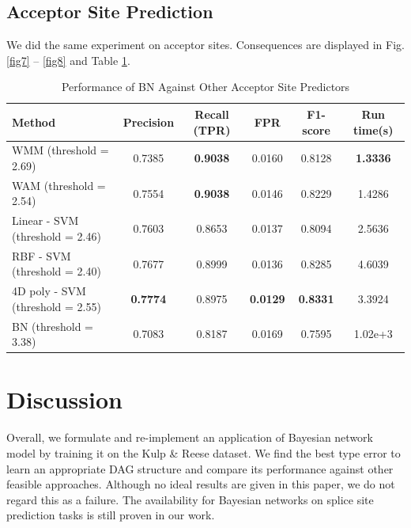 \documentclass[journal,twoside]{IEEEtran}
\begin{document}
\subsection{Acceptor Site Prediction}\label{4.3}

We did the same experiment on acceptor sites. Consequences are displayed in Fig. \ref{fig7} -- \ref{fig8} and Table \ref{tab3}. 


\begin{table}[htbp]
\begin{center}
\begin{threeparttable}
\caption{Performance of BN Against Other Acceptor Site Predictors}
\begin{tabular}{lccccc}
\toprule
Method & Precision & Recall (TPR) & FPR & F1-score & Run time(s) \\
\midrule
WMM (threshold = 2.69) & 0.7385 & \textbf{0.9038} & 0.0160 & 0.8128 & \textbf{1.3336} \\
WAM (threshold = 2.54) & 0.7554 & \textbf{0.9038} & 0.0146 & 0.8229 & 1.4286 \\
Linear - SVM (threshold = 2.46) & 0.7603 & 0.8653 & 0.0137 & 0.8094 & 2.5636 \\
RBF - SVM (threshold = 2.40) & 0.7677 & 0.8999 & 0.0136 & 0.8285 & 4.6039 \\
4D poly - SVM (threshold = 2.55) & \textbf{0.7774} & 0.8975 & \textbf{0.0129} &  \textbf{0.8331} & 3.3924 \\
BN (threshold = 3.38) & 0.7083 & 0.8187 & 0.0169 & 0.7595 & 1.02e+3 \\
\bottomrule
\end{tabular}
\label{tab3}
\end{threeparttable}
\end{center}
\end{table}

\section{Discussion}

Overall, we formulate and re-implement an application of Bayesian network model by training it on the Kulp \& Reese dataset. We find the best type \uppercase\expandafter{} error to learn an appropriate DAG structure and compare its performance against other feasible approaches. Although no ideal results are given in this paper, we do not regard this as a failure. The availability for Bayesian networks on splice site prediction tasks is still proven in our work. 
\end{document}
